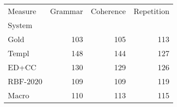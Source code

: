 \begin{tabular}{lrrr}
\toprule
Measure & Grammar & Coherence & Repetition \\
System &  &  &  \\
\midrule
Gold & 103 & 105 & 113 \\
Templ & 148 & 144 & 127 \\
ED+CC & 130 & 129 & 126 \\
RBF-2020 & 109 & 109 & 119 \\
Macro & 110 & 113 & 115 \\
\bottomrule
\end{tabular}
